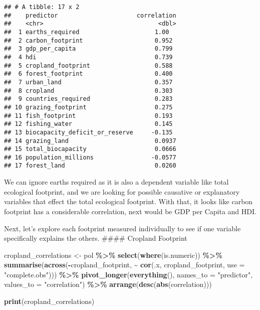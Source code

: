 \documentclass[
]{article}
\newenvironment{Shaded}{\begin{snugshade}}{\end{snugshade}}
\newcommand{\AttributeTok}[1]{\textcolor[rgb]{0.13,0.29,0.53}{#1}}
\newcommand{\FunctionTok}[1]{\textcolor[rgb]{0.13,0.29,0.53}{\textbf{#1}}}
\newcommand{\NormalTok}[1]{#1}
\newcommand{\OtherTok}[1]{\textcolor[rgb]{0.56,0.35,0.01}{#1}}
\newcommand{\SpecialCharTok}[1]{\textcolor[rgb]{0.81,0.36,0.00}{\textbf{#1}}}
\newcommand{\StringTok}[1]{\textcolor[rgb]{0.31,0.60,0.02}{#1}}
\begin{document}
\begin{verbatim}
## # A tibble: 17 x 2
##    predictor                      correlation
##    <chr>                                <dbl>
##  1 earths_required                     1.00  
##  2 carbon_footprint                    0.952 
##  3 gdp_per_capita                      0.799 
##  4 hdi                                 0.739 
##  5 cropland_footprint                  0.588 
##  6 forest_footprint                    0.400 
##  7 urban_land                          0.357 
##  8 cropland                            0.303 
##  9 countries_required                  0.283 
## 10 grazing_footprint                   0.275 
## 11 fish_footprint                      0.193 
## 12 fishing_water                       0.145 
## 13 biocapacity_deficit_or_reserve     -0.135 
## 14 grazing_land                        0.0937
## 15 total_biocapacity                   0.0666
## 16 population_millions                -0.0577
## 17 forest_land                         0.0260
\end{verbatim}

We can ignore earths required as it is also a dependent variable like
total ecological footprint, and we are looking for possible causative or
explanatory variables that effect the total ecological footprint. With
that, it looks like carbon footprint has a considerable correlation,
next would be GDP per Capita and HDI.

Next, let's explore each footprint measured individually to see if one
variable specifically explains the others. \#\#\#\# Cropland Footprint

\begin{Shaded}
\begin{Highlighting}[]
\NormalTok{cropland\_correlations }\OtherTok{\textless{}{-}}\NormalTok{ pol }\SpecialCharTok{\%\textgreater{}\%}
  \FunctionTok{select}\NormalTok{(}\FunctionTok{where}\NormalTok{(is.numeric)) }\SpecialCharTok{\%\textgreater{}\%}
  \FunctionTok{summarise}\NormalTok{(}\FunctionTok{across}\NormalTok{(}\SpecialCharTok{{-}}\NormalTok{cropland\_footprint, }
                   \SpecialCharTok{\textasciitilde{}} \FunctionTok{cor}\NormalTok{(.x, cropland\_footprint, }\AttributeTok{use =} \StringTok{"complete.obs"}\NormalTok{))) }\SpecialCharTok{\%\textgreater{}\%}
  \FunctionTok{pivot\_longer}\NormalTok{(}\FunctionTok{everything}\NormalTok{(), }\AttributeTok{names\_to =} \StringTok{"predictor"}\NormalTok{, }\AttributeTok{values\_to =} \StringTok{"correlation"}\NormalTok{) }\SpecialCharTok{\%\textgreater{}\%}
  \FunctionTok{arrange}\NormalTok{(}\FunctionTok{desc}\NormalTok{(}\FunctionTok{abs}\NormalTok{(correlation)))}

\FunctionTok{print}\NormalTok{(cropland\_correlations)}
\end{Highlighting}
\end{Shaded}
\end{document}
